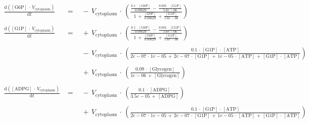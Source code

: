 
$$
\begin{array}{ccl}
\frac {\mathrm{d}\left( {{\mathrm{[G6P]}} \, \cdot \, {V}_{\mathrm{cytoplasm}} } \right) }  {\mathrm{d}{t} }  \; &=& \;  { \, - \, {V}_{\mathrm{cytoplasm}} \, \cdot \, \left(\frac {\frac {{0.1} \, \cdot \, {\mathrm{[G6P]}} } {0.00029} \, - \, \frac {{0.001} \, \cdot \, {\mathrm{[G1P]}} } {5.6e-06} }  { {{1} \, + \, \frac{\mathrm{[G6P]}}{0.00029} }  \, + \, \frac{\mathrm{[G1P]}}{5.6e-06} } \right) } \\ 
 && \\ 
\frac {\mathrm{d}\left( {{\mathrm{[G1P]}} \, \cdot \, {V}_{\mathrm{cytoplasm}} } \right) }  {\mathrm{d}{t} }  \; &=& \;  { \, + \, {V}_{\mathrm{cytoplasm}} \, \cdot \, \left(\frac {\frac {{0.1} \, \cdot \, {\mathrm{[G6P]}} } {0.00029} \, - \, \frac {{0.001} \, \cdot \, {\mathrm{[G1P]}} } {5.6e-06} }  { {{1} \, + \, \frac{\mathrm{[G6P]}}{0.00029} }  \, + \, \frac{\mathrm{[G1P]}}{5.6e-06} } \right) } \\ 
 && \\ 
 \; && \;  { \, - \, {V}_{\mathrm{cytoplasm}} \, \cdot \, \left(\frac { {{0.1} \, \cdot \, {\mathrm{[G1P]}} }  \, \cdot \, {\mathrm{[ATP]}} }  { { { {{2e-07} \, \cdot \, {1e-05} }  \, + \,  {{2e-07} \, \cdot \, {\mathrm{[G1P]}} }  }  \, + \,  {{1e-05} \, \cdot \, {\mathrm{[ATP]}} }  }  \, + \,  {{\mathrm{[G1P]}} \, \cdot \, {\mathrm{[ATP]}} }  } \right) } \\ 
 && \\ 
 \; && \;  { \, + \, {V}_{\mathrm{cytoplasm}} \, \cdot \, \left(\frac {{0.09} \, \cdot \, {\mathrm{[Glycogen]}} }  {{1e-06} \, + \, {\mathrm{[Glycogen]}} } \right) } \\ 
 && \\ 
\frac {\mathrm{d}\left( {{\mathrm{[ADPG]}} \, \cdot \, {V}_{\mathrm{cytoplasm}} } \right) }  {\mathrm{d}{t} }  \; &=& \;  { \, - \, {V}_{\mathrm{cytoplasm}} \, \cdot \, \left(\frac {{0.1} \, \cdot \, {\mathrm{[ADPG]}} }  {{3.5e-05} \, + \, {\mathrm{[ADPG]}} } \right) } \\ 
 && \\ 
 \; && \;  { \, + \, {V}_{\mathrm{cytoplasm}} \, \cdot \, \left(\frac { {{0.1} \, \cdot \, {\mathrm{[G1P]}} }  \, \cdot \, {\mathrm{[ATP]}} }  { { { {{2e-07} \, \cdot \, {1e-05} }  \, + \,  {{2e-07} \, \cdot \, {\mathrm{[G1P]}} }  }  \, + \,  {{1e-05} \, \cdot \, {\mathrm{[ATP]}} }  }  \, + \,  {{\mathrm{[G1P]}} \, \cdot \, {\mathrm{[ATP]}} }  } \right) } \\ 

\end{array}$$
